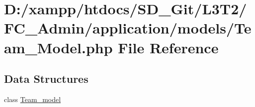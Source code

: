 \hypertarget{_team___model_8php}{}\section{D\+:/xampp/htdocs/\+S\+D\+\_\+\+Git/\+L3\+T2/\+F\+C\+\_\+\+Admin/application/models/\+Team\+\_\+\+Model.php File Reference}
\label{_team___model_8php}
\subsection*{Data Structures}
\begin{DoxyCompactItemize}
\item 
class \hyperlink{class_team__model}{Team\+\_\+model}
\end{DoxyCompactItemize}
